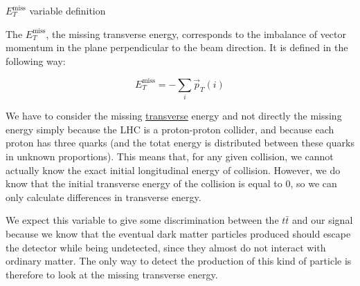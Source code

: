 \documentclass[handout,8 pt]{beamer}
\begin{document}
\begin{frame}{$E_T^{\text{miss}}$ variable definition}

   	\justifying
	The $E_T^{\text{miss}}$, the missing transverse energy, corresponds to the imbalance of vector momentum in the plane perpendicular to the beam direction. It is defined in the following way: \vfill
	
	\begin{equation*}
		E_T^{\text{miss}} = -\sum_i{\overrightarrow{p}_T(i)}
	\end{equation*} \vfill
	
	\justifying
	We have to consider the missing \underline{transverse} energy and not directly the missing energy simply because the LHC is a proton-proton collider, and because each proton has three quarks (and the totat energy is distributed between these quarks in unknown proportions). This means that, for any given collision, we cannot actually know the exact initial longitudinal energy of collision. However, we do know that the initial transverse energy of the collision is equal to 0, so we can only calculate differences in transverse energy. \vfill
	
	\begin{block}{}
	\vspace{5pt}
	\justifying
	We expect this variable to give some discrimination between the $t \bar t$ and our signal because we know that the eventual dark matter particles produced should escape the detector while being undetected, since they almost do not interact with ordinary matter.  The only way to detect the production of this kind of particle is therefore to look at the missing transverse energy. \vspace{5pt}
	\end{block} \vfill

\end{frame}
\end{document}
